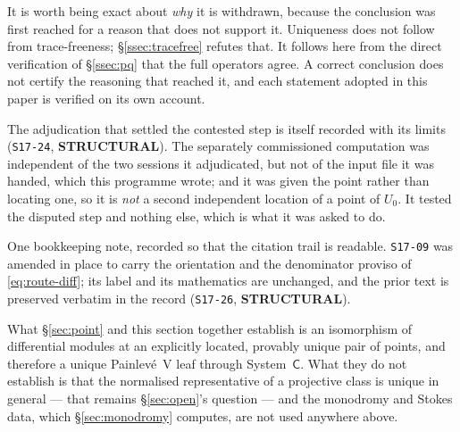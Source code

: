 It is worth being exact about \emph{why} it is withdrawn, because the
conclusion was first reached for a reason that does not support it. Uniqueness
does not follow from trace-freeness; \S\ref{ssec:tracefree} refutes that. It
follows here from the direct verification of \S\ref{ssec:pq} that the full
operators agree. A correct conclusion does not certify the reasoning that
reached it, and each statement adopted in this paper is verified on its own
account.

The adjudication that settled the contested step is itself recorded with its
limits (\texttt{S17-24}, \textbf{STRUCTURAL}). The separately commissioned
computation was independent of the two sessions it adjudicated, but not of the
input file it was handed, which this programme wrote; and it was given the
point rather than locating one, so it is \emph{not} a second independent
location of a point of $U_0$. It tested the disputed step and nothing else,
which is what it was asked to do.

One bookkeeping note, recorded so that the citation trail is readable.
\texttt{S17-09} was amended in place to carry the orientation and the
denominator proviso of \eqref{eq:route-diff}; its label and its mathematics are
unchanged, and the prior text is preserved verbatim in the record
(\texttt{S17-26}, \textbf{STRUCTURAL}).

\medskip
\noindent
What \S\ref{sec:point} and this section together establish is an isomorphism of
differential modules at an explicitly located, provably unique pair of points,
and therefore a unique Painlev\'e~V leaf through System~$\mathsf C$. What they
do not establish is that the normalised representative of a projective class is
unique in general --- that remains \S\ref{sec:open}'s question --- and the
monodromy and Stokes data, which \S\ref{sec:monodromy} computes, are not used
anywhere above.

